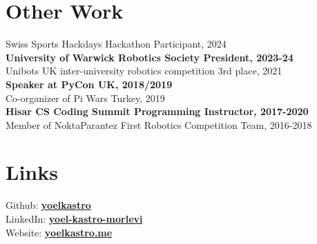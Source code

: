 \documentclass{deedy-resume-reversed}
\begin{document}
\begin{minipage}[t]{0.33\textwidth}


\section{Other Work}
Swiss Sports Hackdays Hackathon Participant, 2024 \\
\textbf{University of Warwick Robotics Society President, 2023-24} \\
Unibots UK inter-university robotics competition 3rd place, 2021 \\
\textbf{Speaker at PyCon UK, 2018/2019} \\
Co-organizer of Pi Wars Turkey, 2019 \\
\textbf{Hisar CS Coding Summit Programming Instructor, 2017-2020} \\
Member of NoktaParantez First Robotics Competition Team, 2016-2018 \\
\sectionsep


\section{Links}
Github: \href{https://github.com/yoelkastro}{\bf yoelkastro} \\
LinkedIn:  \href{https://www.linkedin.com/in/yoel-kastro-morlevi}{\bf yoel-kastro-morlevi} \\
Website: \href{https://www.yoelkastro.me}{\bf yoelkastro.me}
\sectionsep

\end{minipage}
\end{document}
